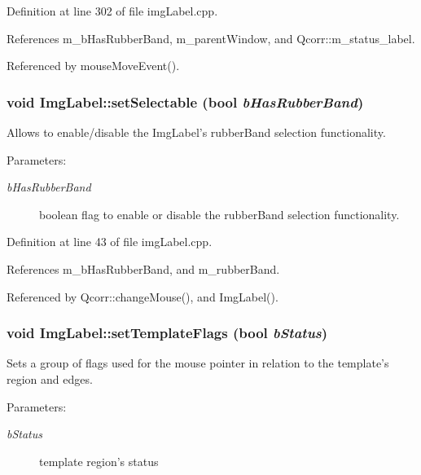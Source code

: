 Definition at line 302 of file imgLabel.cpp.

References m\_\-bHasRubberBand, m\_\-parentWindow, and Qcorr::m\_\-status\_\-label.

Referenced by mouseMoveEvent().\hypertarget{classImgLabel_3e5988fc63515a300e69593c9236e126}{
\subsubsection[{setSelectable}]{\setlength{\rightskip}{0pt plus 5cm}void ImgLabel::setSelectable (bool {\em bHasRubberBand})}}
\label{classImgLabel_3e5988fc63515a300e69593c9236e126}


Allows to enable/disable the ImgLabel's rubberBand selection functionality. 

\begin{Desc}
\item[Parameters:]
\begin{description}
\item[{\em bHasRubberBand}]boolean flag to enable or disable the rubberBand selection functionality. \end{description}
\end{Desc}


Definition at line 43 of file imgLabel.cpp.

References m\_\-bHasRubberBand, and m\_\-rubberBand.

Referenced by Qcorr::changeMouse(), and ImgLabel().\hypertarget{classImgLabel_1d35f5565e1f0fd6234667b40386b2a4}{
\subsubsection[{setTemplateFlags}]{\setlength{\rightskip}{0pt plus 5cm}void ImgLabel::setTemplateFlags (bool {\em bStatus})}}
\label{classImgLabel_1d35f5565e1f0fd6234667b40386b2a4}


Sets a group of flags used for the mouse pointer in relation to the template's region and edges. 

\begin{Desc}
\item[Parameters:]
\begin{description}
\item[{\em bStatus}]template region's status \end{description}
\end{Desc}


